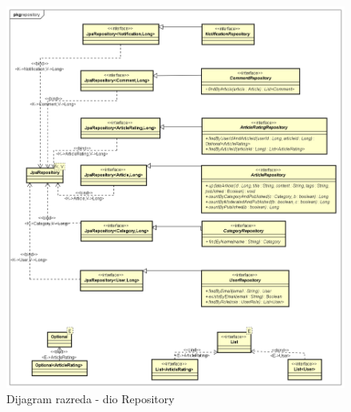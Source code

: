 \begin{figure}[H]
	\includegraphics[scale=0.4]{slike/Class Diagram Repository.png}
	\centering
	\caption{Dijagram razreda - dio Repository}
	\label{fig:class_diagram_repository}
\end{figure}

